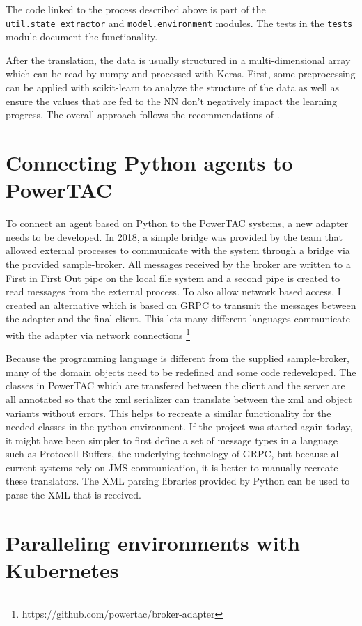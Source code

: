 The code linked to the process described above is part of the \texttt{util.state\_extractor} and
\texttt{model.environment} modules. The tests in the \texttt{tests} module document the functionality.

After the translation, the data is usually structured in a multi-dimensional array which can be read by numpy and
processed with Keras. First, some preprocessing can be applied with scikit-learn to analyze the structure of the data as
well as ensure the values that are fed to the \ac {NN} don't negatively impact the learning progress. The overall
approach follows the recommendations of \citeauthor{Goodfellow-et-al-2016}.  

\section{Connecting Python agents to PowerTAC}

To connect an agent based on Python to the \ac{PowerTAC} systems, a new adapter needs to be developed. In 2018, a simple bridge was provided by the team that allowed external processes to communicate with the system through a bridge via the provided sample-broker. All messages received by the broker are written to a First in First Out pipe on the local file system and a second pipe is created to read messages from the external process. To also allow network based access, I created an alternative which is based on \ac{GRPC} to transmit the messages between the adapter and the final client. This lets many different languages communicate with the adapter via network connections \footnote{https://github.com/powertac/broker-adapter} 

Because the programming language is different from the supplied sample-broker, many of the domain objects need to be redefined and some code redeveloped. The classes in \ac {PowerTAC} which are transfered between the client and the server are all annotated so that the xml serializer can translate between the xml and object variants without errors. This helps to recreate a similar functionality for the needed classes in the python environment. If the project was started again today, it might have been simpler to first define a set of message types in a language such as Protocoll Buffers, the underlying technology of \ac {GRPC}, but because all current systems rely on \ac {JMS} communication, it is better to manually recreate these translators. The \ac {XML} parsing libraries provided by Python can be used to parse the \ac {XML} that is received.
\section{Paralleling environments with Kubernetes}

